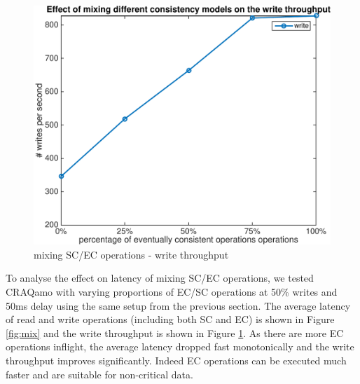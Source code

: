 \begin{figure}[h]
\centering
\includegraphics[width=0.95\linewidth]{figures/throughput.pdf}
\caption{mixing SC/EC operations - write throughput}
\label{fig:mix_throughput}
\end{figure}
\vspace{-5mm}

To analyse the effect on latency of mixing SC/EC operations, we tested CRAQamo with varying proportions of EC/SC operations at 50\% writes and 50ms delay using the same setup from the previous section. The average latency of read and write operations (including both SC and EC) is shown in Figure \ref{fig:mix} and the write throughput is shown in Figure \ref{fig:mix_throughput}.  As there are more EC operations inflight, the average latency dropped fast monotonically and the write throughput improves significantly. Indeed EC operations can be executed much faster and are suitable for non-critical data. 


